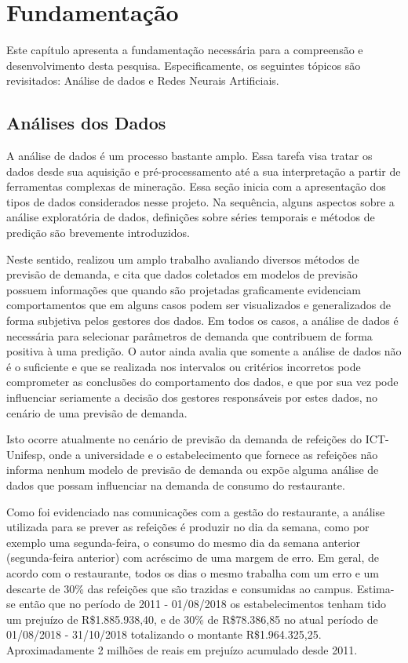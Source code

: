   \chapter{Fundamentação} \label{cap:teoria}
  
Este capítulo apresenta a fundamentação necessária para a compreensão e desenvolvimento desta pesquisa. Especificamente, os seguintes tópicos são revisitados: 
Análise de dados e Redes Neurais Artificiais.
 
\section{Análises dos Dados}

A análise de dados é um processo bastante amplo. Essa tarefa visa tratar os dados desde sua aquisição e pré-processamento até a sua interpretação a partir de ferramentas complexas de mineração. Essa seção inicia com a apresentação dos tipos de dados considerados nesse projeto. Na sequência, alguns aspectos sobre a análise exploratória de dados, definições sobre séries temporais e métodos de predição são brevemente introduzidos.


Neste sentido,  realizou um amplo trabalho avaliando  diversos métodos de previsão de demanda, e cita que dados coletados em modelos de previsão possuem informações que quando são projetadas graficamente evidenciam comportamentos que em alguns casos podem ser visualizados e generalizados de forma subjetiva pelos gestores dos dados. Em todos os casos, a análise de dados é necessária para selecionar parâmetros de demanda que contribuem de forma positiva à uma predição. O autor ainda avalia que somente a análise de dados não é o suficiente e que se realizada nos intervalos ou critérios incorretos pode comprometer as conclusões do comportamento dos dados, e que por sua vez pode influenciar seriamente a decisão dos gestores responsáveis por estes dados, no cenário de uma previsão de demanda.

Isto ocorre atualmente no cenário de previsão da demanda de refeições do ICT-Unifesp, onde a universidade e o estabelecimento que fornece as refeições não informa nenhum modelo de previsão de demanda ou expõe alguma análise de dados que possam influenciar na demanda de consumo do restaurante. 

Como foi evidenciado nas comunicações com a gestão do restaurante, a análise utilizada para se prever as refeições é produzir no dia da semana, como por exemplo uma segunda-feira, o consumo do mesmo dia da semana anterior (segunda-feira anterior) com acréscimo de uma margem de erro. Em geral, de acordo com o restaurante, todos os dias o mesmo trabalha com um erro e um descarte de 30\% das refeições que são trazidas e consumidas ao campus. Estima-se então que no período de 2011 - 01/08/2018 os estabelecimentos tenham tido um prejuízo de R\$1.885.938,40, e de 30\% de R\$78.386,85 no atual período de 01/08/2018 - 31/10/2018 totalizando o montante  R\$1.964.325,25. Aproximadamente 2 milhões de reais em prejuízo acumulado desde 2011.


